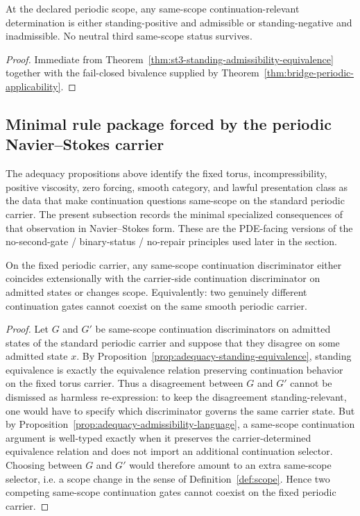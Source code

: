 \begin{corollary}\label{cor:no-standing-neutral-status-fixed-periodic}
At the declared periodic scope, any same-scope continuation-relevant determination is either standing-positive and admissible or standing-negative and inadmissible. No neutral third same-scope status survives.
\end{corollary}

\begin{proof}
Immediate from Theorem~\ref{thm:st3-standing-admissibility-equivalence} together with the fail-closed bivalence supplied by Theorem~\ref{thm:bridge-periodic-applicability}.
\end{proof}

\subsection{Minimal rule package forced by the periodic Navier--Stokes carrier}
\label{subsec:ns-specialized-rule-package}
The adequacy propositions above identify the fixed torus, incompressibility, positive viscosity,
zero forcing, smooth category, and lawful presentation class as the data that make continuation
questions same-scope on the standard periodic carrier. The present subsection records the minimal
specialized consequences of that observation in Navier--Stokes form. These are the PDE-facing
versions of the no-second-gate / binary-status / no-repair principles used later in the section.

\begin{theorem}
\label{thm:ns-no-competing-gates}
On the fixed periodic carrier, any same-scope continuation discriminator either coincides
extensionally with the carrier-side continuation discriminator on admitted states or changes scope.
Equivalently: two genuinely different continuation gates cannot coexist on the same smooth periodic
carrier.
\end{theorem}

\begin{proof}
Let $G$ and $G'$ be same-scope continuation discriminators on admitted states of the standard
periodic carrier and suppose that they disagree on some admitted state $x$. By
Proposition~\ref{prop:adequacy-standing-equivalence}, standing equivalence is exactly the equivalence
relation preserving continuation behavior on the fixed torus carrier. Thus a disagreement between
$G$ and $G'$ cannot be dismissed as harmless re-expression: to keep the disagreement
standing-relevant, one would have to specify which discriminator governs the same carrier state. But
by Proposition~\ref{prop:adequacy-admissibility-language}, a same-scope continuation argument is
well-typed exactly when it preserves the carrier-determined equivalence relation and does not import
an additional continuation selector. Choosing between $G$ and $G'$ would therefore amount to an
extra same-scope selector, i.e. a scope change in the sense of Definition~\ref{def:scope}. Hence two
competing same-scope continuation gates cannot coexist on the fixed periodic carrier.
\end{proof}

